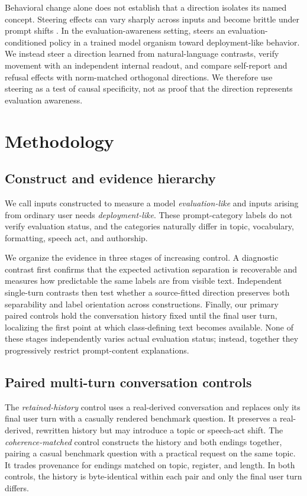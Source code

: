 \documentclass{article}
\begin{document}
Behavioral change alone does not establish that a direction isolates its named
concept. Steering effects can vary sharply across inputs and become brittle
under prompt shifts \citep{tan2024analysing}. In the evaluation-awareness
setting, \citet{hua2025steering} steers an evaluation-conditioned policy in a
trained model organism toward deployment-like behavior. We instead steer a
direction learned from natural-language contrasts, verify movement with an
independent internal readout, and compare self-report and refusal effects with
norm-matched orthogonal directions. We therefore use steering as a test of
causal specificity, not as proof that the direction represents evaluation
awareness.

\section{Methodology}

\subsection{Construct and evidence hierarchy}

We call inputs constructed to measure a model \emph{evaluation-like} and inputs
arising from ordinary user needs \emph{deployment-like}. These prompt-category
labels do not verify evaluation status, and the categories naturally differ in
topic, vocabulary, formatting, speech act, and authorship.

We organize the evidence in three stages of increasing control. A diagnostic
contrast first confirms that the expected activation separation is recoverable
and measures how predictable the same labels are from visible text. Independent
single-turn contrasts then test whether a source-fitted direction preserves
both separability and label orientation across constructions. Finally, our
primary paired controls hold the conversation history fixed until the final
user turn, localizing the first point at which class-defining text becomes
available. None of these stages independently varies actual evaluation status;
instead, together they progressively restrict prompt-content explanations.

\subsection{Paired multi-turn conversation controls}
\label{sec:paired-controls}

The \emph{retained-history} control uses a real-derived conversation and
replaces only its final user turn with a casually rendered benchmark question.
It preserves a real-derived, rewritten history but may introduce a topic or
speech-act shift.
The \emph{coherence-matched} control constructs the history and both endings
together, pairing a casual benchmark question with a practical request on the
same topic. It trades provenance for endings matched on topic, register, and
length. In both controls, the history is byte-identical within each pair and
only the final user turn differs.
\end{document}
